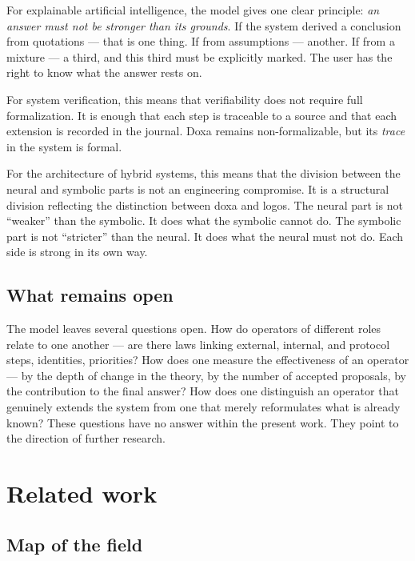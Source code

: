 \documentclass[12pt,a4paper]{article}
\begin{document}
For explainable artificial intelligence, the model gives one clear principle:
\emph{an answer must not be stronger than its grounds}. If the system derived
a conclusion from quotations --- that is one thing. If from assumptions ---
another. If from a mixture --- a third, and this third must be explicitly
marked. The user has the right to know what the answer rests on.

For system verification, this means that verifiability does not require full
formalization. It is enough that each step is traceable to a source and that
each extension is recorded in the journal. Doxa remains non-formalizable, but
its \emph{trace} in the system is formal.

For the architecture of hybrid systems, this means that the division between
the neural and symbolic parts is not an engineering compromise. It is a
structural division reflecting the distinction between doxa and logos. The
neural part is not ``weaker'' than the symbolic. It does what the symbolic
cannot do. The symbolic part is not ``stricter'' than the neural. It does what
the neural must not do. Each side is strong in its own way.

\subsection{What remains open}
\label{sec:open}

The model leaves several questions open. How do operators of different roles
relate to one another --- are there laws linking external, internal, and
protocol steps, identities, priorities? How does one measure the effectiveness
of an operator --- by the depth of change in the theory, by the number of
accepted proposals, by the contribution to the final answer? How does one
distinguish an operator that genuinely extends the system from one that merely
reformulates what is already known? These questions have no answer within the
present work. They point to the direction of further research.

\section{Related work}
\label{sec:related}

\subsection{Map of the field}
\label{sec:map}
\end{document}
